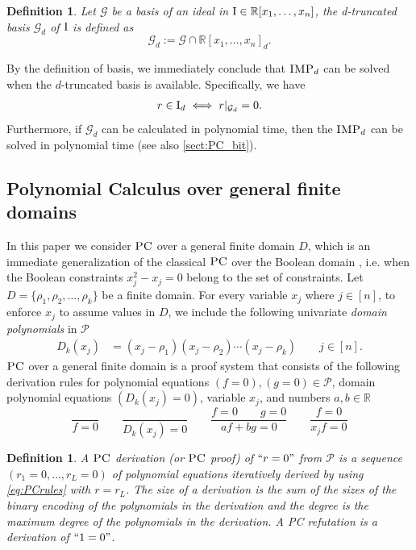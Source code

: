 \documentclass[11pt]{article}
\newcommand{\IMP}{\textsc{IMP}}
\newcommand{\PC}{\textsc{PC}}
\newcommand{\I}{\emph{$\rm{I}$}}
\newcommand{\1}{\textbf{1}}
\newcommand{\GB}{\text{Gr\"{o}bner} }
\newtheorem{definition}[theorem]{Definition}
\begin{document}
\begin{definition}\label{def:dTruncated GB}
  Let $\mathcal{G}$ be a \GB basis of an ideal in $\I \in \mathbb{R}[x_1,\dots,x_n]$, the \emph{d-truncated \GB basis} $\mathcal{G}_d$ of $\I$ is defined as
  \begin{equation}\label{eq:Gd}
      \mathcal{G}_d := \mathcal{G} \cap \mathbb{R}[x_1,\dots,x_n]_d.
  \end{equation}
\end{definition}

By the definition of \GB basis, we immediately conclude that $\IMP_d$ can be solved when the $d$-truncated \GB basis is available. Specifically, we have
\begin{align*}
    r \in \I_d \iff r|_{\mathcal{G}_d} = 0.
\end{align*}
Furthermore, if $\mathcal{G}_d$ can be calculated in polynomial time, then the $\IMP_d$ can be solved in polynomial time (see also \cref{sect:PC_bit}).

\subsection*{Polynomial Calculus over general finite domains}

In this paper we consider $\PC$ over a general finite domain $D$, which is an immediate generalization of the classical $\PC$ over the Boolean domain \cite{CleggEI96}, i.e. when the Boolean constraints $x_j^2 - x_j = 0$ belong to the set of constraints. Let $D = \{\rho_1, \rho_2, \ldots, \rho_k\}$ be a finite domain. For every variable $x_j$ where $j \in [n]$, to enforce $x_j$ to assume values in $D$, we include the following univariate \emph{domain polynomials} in $\mathcal{P}$
\begin{align*}
    D_{k}(x_j)&=(x_j-\rho_{1})(x_j-\rho_{2})\cdots (x_j-\rho_{k}) \qquad j \in [n].
\end{align*}
$\PC$ over a general finite domain is a proof system that consists of the following derivation rules for polynomial equations $(f = 0), (g = 0) \in  \mathcal{P}$, domain polynomial equations $(D_{k}(x_j)=0)$, variable $x_j$, and numbers $a, b \in \mathbb{R}$
\begin{equation}\label{eq:PCrules}
    \frac{}{f=0} \qquad \frac{}{D_{k}(x_j)=0} \qquad \frac{f=0 \qquad g=0}{a f + b g =0} \qquad \frac{f=0}{x_jf=0} 
\end{equation}

\begin{definition}\label{def:pc_derivation}
    A \emph{$\PC$ derivation} (or \emph{$\PC$ proof}) of $``r=0"$ from $\mathcal{P}$ is a sequence $(r_1=0,\ldots,r_L=0)$ of polynomial equations iteratively derived by using \eqref{eq:PCrules} with $r=r_L$. The \emph{size} of a derivation is the sum of the sizes of the binary encoding of the polynomials in the derivation and the \emph{degree} is the maximum degree of the polynomials in the derivation. A \emph{PC refutation} is a derivation of $``1=0"$.
\end{definition}
\end{document}

